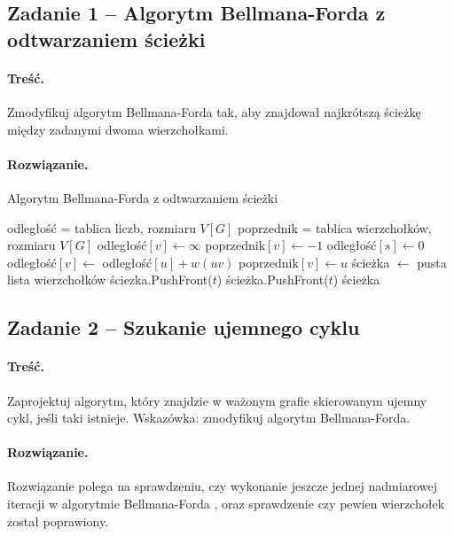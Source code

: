 \subsection{Zadanie 1 -- Algorytm Bellmana-Forda z odtwarzaniem ścieżki}
\paragraph{Treść.}Zmodyfikuj algorytm Bellmana-Forda tak, 
aby znajdował najkrótszą ścieżkę między zadanymi dwoma
wierzchołkami.

\paragraph{Rozwiązanie.}

\begin{algorithm}[H]
	\caption{Algorytm Bellmana-Forda z odtwarzaniem ścieżki}
	\begin{algorithmic}[1]

		\State odległość = tablica liczb, rozmiaru $V[G]$
		\State poprzednik = tablica wierzchołków, rozmiaru $V[G]$
		\State odległość$[v]\gets\infty$
		\State poprzednik$[v]\gets-1$
		\EndFor
		\State odległość$[s]\gets0$
		\State odległość$[v]\gets$ odległość$[u] + w(uv)$ 
		\State poprzednik$[v]\gets u$
		\EndIf
		\EndFor
		\EndFor
		\State ścieżka $\gets$ pusta lista wierzchołków
		\State ściezka.PushFront($t$)
		\State ścieżka.PushFront($t$)
		\EndWhile
		\State \Return ścieżka
		\EndProcedure
	\end{algorithmic}
	\label{Zadanie31}
\end{algorithm}
\subsection{Zadanie 2 -- Szukanie ujemnego cyklu}
\paragraph{Treść.}Zaprojektuj algorytm, który znajdzie w 
ważonym grafie skierowanym ujemny cykl, jeśli taki istnieje.
Wskazówka: zmodyfikuj algorytm Bellmana-Forda.

\paragraph{Rozwiązanie.}
Rozwiązanie polega na sprawdzeniu, czy wykonanie
jeszcze jednej nadmiarowej iteracji 
w algorytmie Bellmana-Forda %
, oraz sprawdzenie
czy pewien wierzchołek został poprawiony. %

